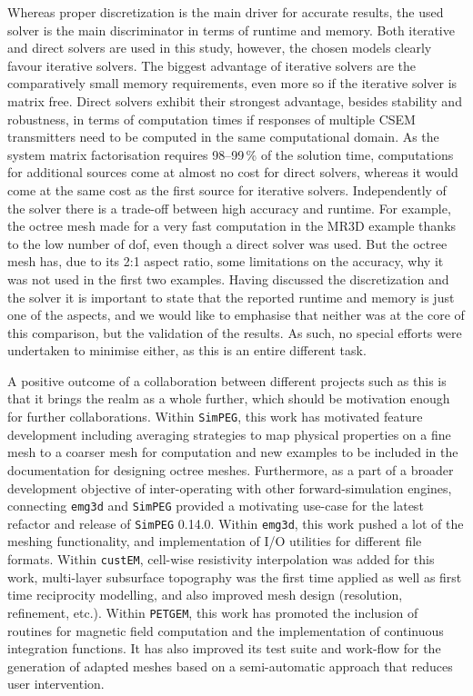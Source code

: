 \documentclass[a4paper, extra, camera,%
]{gji}
\newcommand{\simpeg}{\texttt{SimPEG}\xspace}
\newcommand{\custem}{\texttt{custEM}\xspace}
\newcommand{\petgem}{\texttt{PETGEM}\xspace}
\begin{document}
Whereas proper discretization is the main driver for accurate results, the used solver is the main discriminator in terms of runtime and memory. Both iterative and direct solvers are used in this study, however, the chosen models clearly favour iterative solvers. The biggest advantage of iterative solvers are the comparatively small memory requirements, even more so if the iterative solver is matrix free. Direct solvers exhibit their strongest advantage, besides stability and robustness, in terms of computation times if responses of multiple CSEM transmitters need to be computed in the same computational domain. As the system matrix factorisation requires 98--99\,\% of the solution time, computations for additional sources come at almost no cost for direct solvers, whereas it would come at the same cost as the first source for iterative solvers. Independently of the solver there is a trade-off between high accuracy and runtime. For example, the octree mesh made for a very fast computation in the MR3D example thanks to the low number of dof, even though a direct solver was used. But the octree mesh has, due to its 2:1 aspect ratio, some limitations on the accuracy, why it was not used in the first two examples. Having discussed the discretization and the solver it is important to state that the reported runtime and memory is just one of the aspects, and we would like to emphasise that neither was at the core of this comparison, but the validation of the results. As such, no special efforts were undertaken to minimise either, as this is an entire different task.

A positive outcome of a collaboration between different projects such as this is that it brings the realm as a whole further, which should be motivation enough for further collaborations. Within \simpeg, this work has motivated feature development including averaging strategies to map physical properties on a fine mesh to a coarser mesh for computation and new examples to be included in the documentation for designing octree meshes. Furthermore, as a part of a broader development objective of inter-operating with other forward-simulation engines, connecting \texttt{emg3d} and \simpeg provided a motivating use-case for the latest refactor and release of \simpeg 0.14.0. Within \texttt{emg3d}, this work pushed a lot of the meshing functionality, and implementation of I/O utilities for different file formats. Within \custem, cell-wise resistivity interpolation was added for this work, multi-layer subsurface topography was the first time applied as well as first time reciprocity modelling, and also improved mesh design (resolution, refinement, etc.). Within \petgem, this work has promoted the inclusion of routines for magnetic field computation and the implementation of continuous integration functions. It has also improved its test suite and work-flow for the generation of adapted meshes based on a semi-automatic approach that reduces user intervention.
\end{document}
